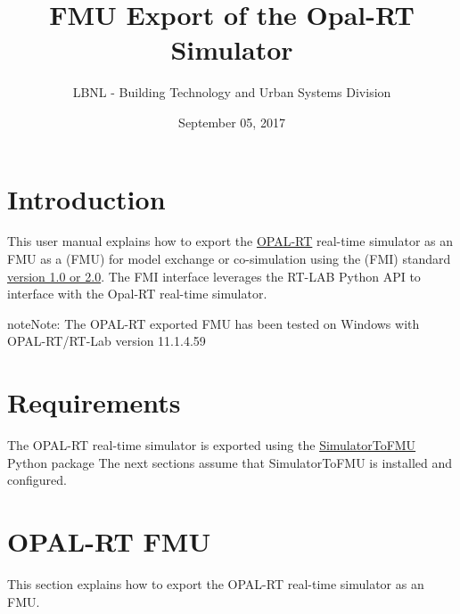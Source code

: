 \documentclass[letterpaper,10pt,english]{sphinxmanual}
\title{FMU Export of the Opal-RT Simulator}
\date{September 05, 2017}
\author{LBNL - Building Technology and Urban Systems Division}
\begin{document}
\maketitle
\tableofcontents
{}\label{index::doc}



\chapter{Introduction}
\label{introduction:introduction}\label{introduction::doc}\label{introduction:user-guide}\label{introduction:id1}
This user manual explains how to export the \href{https://www.opal-rt.com/}{OPAL-RT}
real-time simulator as an FMU as a {\hyperref[glossary:term\string-functional\string-mock\string-up\string-unit]{\emph{}}} (FMU) for
model exchange or co-simulation using the {\hyperref[glossary:term\string-functional\string-mock\string-up\string-interface]{\emph{}}} (FMI)
standard \href{https://www.fmi-standard.org}{version 1.0 or 2.0}.
The FMI interface leverages the RT-LAB Python API to interface with the Opal-RT real-time simulator.

\begin{notice}{note}{Note:}
The OPAL-RT exported FMU has been tested on Windows with OPAL-RT/RT-Lab version 11.1.4.59
\end{notice}


\chapter{Requirements}
\label{installation:installation}\label{installation:requirements}\label{installation::doc}
The OPAL-RT real-time simulator is exported using the
\href{https://pypi.python.org/pypi/SimulatorToFMU/}{SimulatorToFMU} Python package
The next sections assume that SimulatorToFMU is installed and
configured.


\chapter{OPAL-RT FMU}
\label{bestPractice::doc}\label{bestPractice:bestpractice}\label{bestPractice:opal-rt-fmu}
This section explains how to export the OPAL-RT real-time simulator as an FMU.
\end{document}
